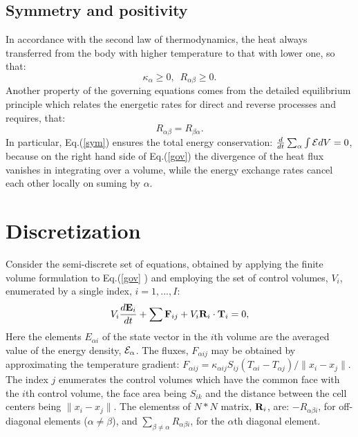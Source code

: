 \documentclass[12pt]{revtex4}
\begin{document}
\subsection{Symmetry and positivity}
In accordance with the second law of thermodynamics, the heat always transferred from 
the body with higher temperature to that with lower one, so that:
\begin{equation}\label{pos}
\kappa_\alpha\ge0,\,\,\,R_{\alpha\beta}\ge0.
\end{equation}
Another property of the governing equations comes from the detailed equilibrium 
principle which relates the energetic rates for direct and reverse processes
and requires, that:
\begin{equation}\label{sym}
R_{\alpha\beta}=R_{\beta\alpha}.
\end{equation}
In particular, Eq.(\ref{sym}) ensures the total energy conservation:
$\frac{d}{dt}\sum_\alpha{\int{{\cal E}dV}}=0$, 
because on the right hand side of Eq.(\ref{gov}) the divergence of the heat flux vanishes in integrating
over a volume, while the energy exchange rates cancel each other locally on suming by $\alpha$.
\section{Discretization}
Consider the semi-discrete set of equations, obtained by 
applying the finite volume formulation to Eq.(\ref{gov} ) and employing the set of 
control volumes, $V_i$, enumerated by a single index, $i=1,...,I$:  
\begin{equation}\label{sem}
V_i\frac{d {\bf E}_i}{d t} + \sum{{\bf F}_{ij}}+V_i{\bf R}_i\cdot {\bf T}_i=0,
\end{equation}
Here the elements $E_{\alpha i}$ of the state vector in the $i$th volume are the 
averaged value of the energy density, ${\cal E}_\alpha$. The %
fluxes, 
$F_{\alpha ij}$ may be obtained by approximating the temperature gradient: 
$F_{\alpha ij}= \kappa_{\alpha ij}S_{ij}(T_{\alpha i}- T_{\alpha j})/\|x_i-x_j\|$. The 
index $j$ enumerates the control volumes which have the common face with the $i$th 
control volume, the face area being $S_{ik}$ and the distance 
between the cell centers being $\|x_i-x_j\|$.
%
The elementss of $N*N$ matrix, ${\bf R}_i$, are: 
$-R_{\alpha\beta i}$, for off-diagonal elements ($\alpha\ne\beta$), and 
$\sum_{\beta\ne\alpha}R_{\alpha\beta i}$,
for the $\alpha$th diagonal element.
\end{document}
